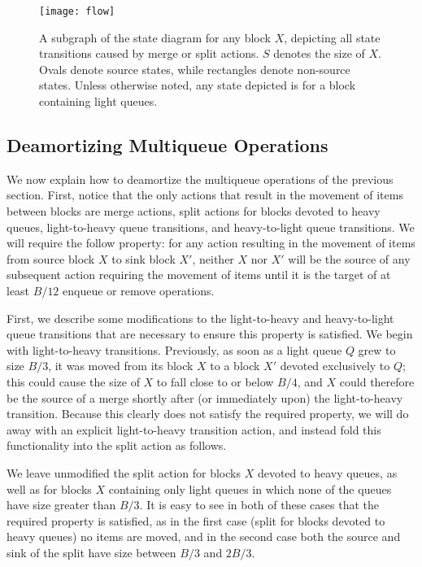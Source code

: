 \documentclass[11pt,letterpaper]{article}
\begin{document}
\begin{figure*}
\begin{center}
\texttt{[image: flow]}
\caption{A subgraph of the state diagram for any block $X$, depicting all state transitions caused by merge or split actions. $S$ denotes the size of $X$. Ovals denote source states,
while rectangles denote non-source states. Unless otherwise noted, any state depicted is for a block containing light queues.}
\label{flow}
\end{center}
\end{figure*}

\subsection{Deamortizing Multiqueue Operations}
\label{sec:app}
We now explain how to deamortize the multiqueue operations of the previous section. First, notice that the only actions that result in the movement of items between blocks are merge actions, split actions for blocks devoted to heavy queues, light-to-heavy queue transitions, and heavy-to-light queue transitions. We will require the follow property: for any action resulting in the movement of items from source block $X$ to sink block $X'$, neither $X$ nor $X'$ will
be the source of any subsequent action requiring the movement of items until it is the target of at least $B/12$ enqueue or remove operations.

First, we describe some modifications to the light-to-heavy and heavy-to-light queue transitions that are necessary to ensure this property is satisfied. We begin with light-to-heavy transitions. Previously, as soon as a light
queue $Q$ grew to size $B/3$, it was moved from its block $X$ to a block $X'$ devoted exclusively to $Q$; this could cause the size of $X$ to fall close to or below $B/4$, and $X$ could therefore be the source of a merge shortly after (or immediately upon) the light-to-heavy transition. Because this clearly does not satisfy the required property, we will do away with an explicit light-to-heavy transition action, and instead fold this functionality into the split action as follows. 

We leave unmodified the split action for blocks $X$ devoted to heavy queues, as well as for blocks $X$ containing only light queues in which none of the queues have size greater than $B/3$. It is easy to see in both of these cases that the required property is satisfied, as in the first case (split for blocks devoted to heavy queues) no items are moved, and in the second case both the source and sink of the split have size between $B/3$ and $2B/3$. 
\end{document}
